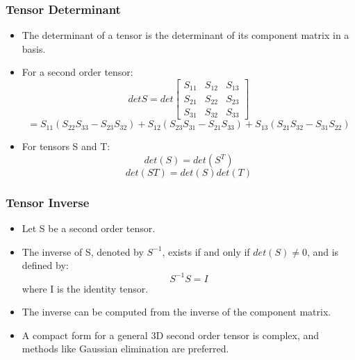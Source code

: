 \documentclass{beamer}
\begin{document}
\begin{frame}
\frametitle{Tensor Determinant}
\begin{itemize}
    \item The determinant of a tensor is the determinant of its component matrix in a basis. 
    \item For a second order tensor: 
    \[
    det S = det
    \begin{bmatrix}
        S_{11} & S_{12} & S_{13} \\
        S_{21} & S_{22} & S_{23} \\
        S_{31} & S_{32} & S_{33}
    \end{bmatrix}
    \]
    \small
    \[
    = S_{11}(S_{22}S_{33} - S_{23}S_{32}) + S_{12}(S_{23}S_{31} - S_{21}S_{33}) + S_{13}(S_{21}S_{32} - S_{31}S_{22})
    \]

    \item For tensors S and T: 
    \[
    det(S) = det(S^T)
    \]
    \[
    det(S T) = det(S)det(T)
    \]
\end{itemize}
\end{frame}

\begin{frame}
\frametitle{Tensor Inverse}
\begin{itemize}
    \item Let S be a second order tensor. 
    \item The inverse of S, denoted by \(S^{-1}\), exists if and only if \(det(S) \neq 0\), and is defined by: 
    \[
    S^{-1} S = I
    \]
    where I is the identity tensor.
    \item The inverse can be computed from the inverse of the component matrix. 
    \item A compact form for a general 3D second order tensor is complex, and methods like Gaussian elimination are preferred. 
\end{itemize}
\end{frame}
\end{document}

